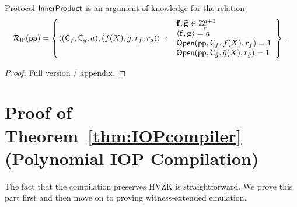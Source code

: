 \begin{lemma}
    Protocol $\textsf{{InnerProduct}}$ is an argument of knowledge for the relation
\[\mathcal{R}_\mathsf{IP}(\textsf{pp}) = \left\{
    \langle(\mathsf{C}_{f}, \mathsf{C}_{\bar{g}}, a), ({f}(X), \bar{g}, r_f, r_{\bar{g}})\rangle \ : \     \begin{array}{l}
            \mathbf{f}, \mathbf{\bar{g}} \in \mathbb{Z}_p^{d+1} \\
            \langle \mathbf{f}, \mathbf{g} \rangle = a \\
            \textsf{{Open}}(\textsf{pp}, \mathsf{C}_{f}, {f}(X), r_f) = 1 \\
            \textsf{{Open}}(\textsf{pp}, \mathsf{C}_{\bar{g}}, {\bar{g}}(X), r_{\bar{g}}) = 1
        \end{array}
    \right\} \enspace .
\]
\end{lemma}

\begin{proof}
Full version / appendix.
\end{proof}
\fi 

\section{Proof of Theorem~\ref{thm:IOPcompiler} (Polynomial IOP Compilation)}\label{sec:IOPcompilerproof}
The fact that the compilation preserves HVZK is straightforward. We prove this part first and then move on to proving witness-extended emulation. 


